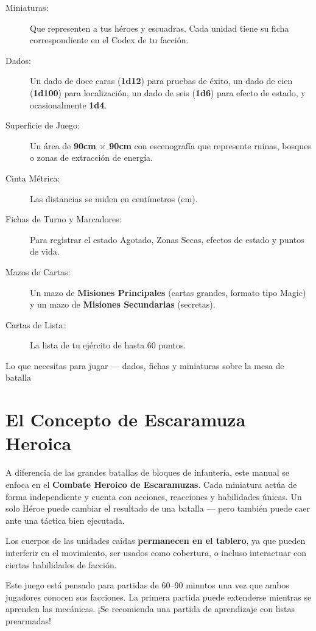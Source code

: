 \begin{description}
    \item[Miniaturas:] Que representen a tus héroes y escuadras. Cada unidad tiene su ficha correspondiente en el Codex de tu facción.
    \item[Dados:] Un dado de doce caras (\textbf{1d12}) para pruebas de éxito, un dado de cien (\textbf{1d100}) para localización, un dado de seis (\textbf{1d6}) para efecto de estado, y ocasionalmente \textbf{1d4}.
    \item[Superficie de Juego:] Un área de \textbf{90cm $\times$ 90cm} con escenografía que represente ruinas, bosques o zonas de extracción de energía.
    \item[Cinta Métrica:] Las distancias se miden en centímetros (cm).
    \item[Fichas de Turno y Marcadores:] Para registrar el estado Agotado, Zonas Secas, efectos de estado y puntos de vida.
    \item[Mazos de Cartas:] Un mazo de \textbf{Misiones Principales} (cartas grandes, formato tipo Magic) y un mazo de \textbf{Misiones Secundarias} (secretas).
    \item[Cartas de Lista:] La lista de tu ejército de hasta 60 puntos.
\end{description}

\begin{imagebox}{Lo que necesitas para jugar — dados, fichas y miniaturas sobre la mesa de batalla}
    \vspace{2cm}
\end{imagebox}

\section{El Concepto de Escaramuza Heroica}

A diferencia de las grandes batallas de bloques de infantería, este manual se enfoca en el \textbf{Combate Heroico de Escaramuzas}. Cada miniatura actúa de forma independiente y cuenta con acciones, reacciones y habilidades únicas. Un solo Héroe puede cambiar el resultado de una batalla — pero también puede caer ante una táctica bien ejecutada.

Los cuerpos de las unidades caídas \textbf{permanecen en el tablero}, ya que pueden interferir en el movimiento, ser usados como cobertura, o incluso interactuar con ciertas habilidades de facción.

\begin{tcolorbox}[colback=HammerRed!8, colframe=HammerRed, title=\textbf{NOTA DEL DISEÑADOR}]
\small Este juego está pensado para partidas de 60--90 minutos una vez que ambos jugadores conocen sus facciones. La primera partida puede extenderse mientras se aprenden las mecánicas. ¡Se recomienda una partida de aprendizaje con listas prearmadas!
\end{tcolorbox}
